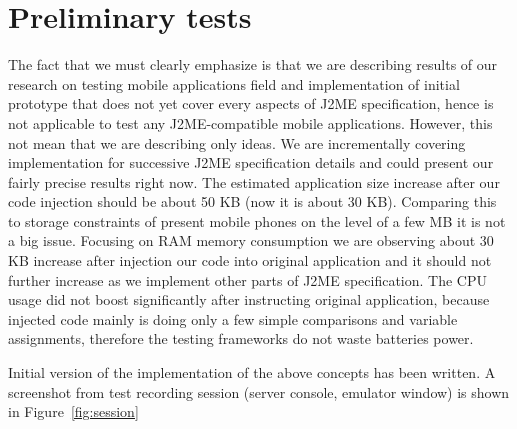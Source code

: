 \documentclass[a4paper,10pt,oneside,final]{dweiss-technote}
\begin{document}
\section{Preliminary tests}

The fact that we must clearly emphasize is that we are describing results of our research on testing
mobile applications field and implementation of initial prototype that does not yet cover every
aspects of J2ME specification, hence is not applicable to test any J2ME-compatible mobile
applications. However, this not mean that we are describing only ideas. We are incrementally
covering implementation for successive J2ME specification details and could present our fairly
precise results right now. The estimated application size increase after our code injection should
be about 50 KB (now it is about 30 KB). Comparing this to storage constraints of present mobile
phones on the level of a few MB it is not a big issue. Focusing on RAM memory consumption we are
observing about 30 KB increase after injection our code into original application and it should not
further increase as we implement other parts of J2ME specification. The CPU usage did not boost
significantly after instructing original application, because injected code mainly is doing only a
few simple comparisons and variable assignments, therefore the testing frameworks do not waste
batteries power.

Initial version of the implementation of the above concepts has been written. A 
screenshot from test recording session (server console, emulator window) is 
shown in Figure~\vref{fig:session}




\end{document}
